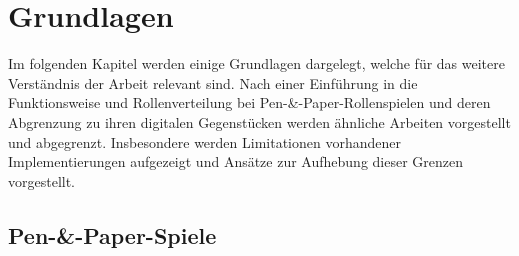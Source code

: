 \chapter{Grundlagen}
\label{background}

Im folgenden Kapitel werden einige Grundlagen dargelegt, welche für das weitere Verständnis der Arbeit relevant sind. Nach einer Einführung in die Funktionsweise und Rollenverteilung bei Pen-\&-Paper-Rollenspielen und deren Abgrenzung zu ihren digitalen Gegenstücken werden ähnliche Arbeiten vorgestellt und abgegrenzt. Insbesondere werden Limitationen vorhandener Implementierungen aufgezeigt und Ansätze zur Aufhebung dieser Grenzen vorgestellt.




\section{Pen-\&-Paper-Spiele}
\label{sec:PenPaperSpiele}


